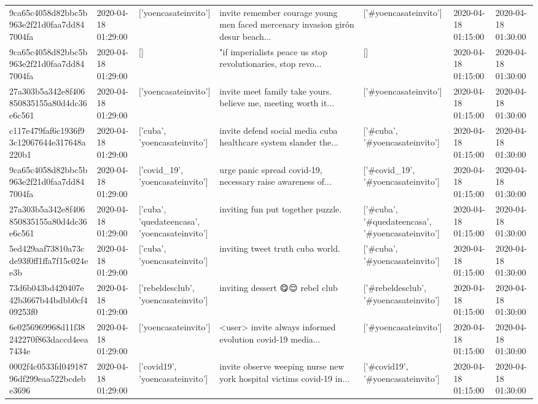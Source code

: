 \begin{tabular}{lllllll}
9ca65c4058d82bbc5b963e2f21d0faa7dd847004fa & 2020-04-18 01:29:00 & ['yoencasateinvito'] & invite remember courage young men faced mercenary invasion girón desur beach... & ['#yoencasateinvito'] & 2020-04-18 01:15:00 & 2020-04-18 01:30:00 \\
9ca65c4058d82bbc5b963e2f21d0faa7dd847004fa & 2020-04-18 01:29:00 & [] & "if imperialists peace us stop revolutionaries, stop revo... & [] & 2020-04-18 01:15:00 & 2020-04-18 01:30:00 \\
27a303b5a342e8f406850835155a80d4dc36e6c561 & 2020-04-18 01:29:00 & ['yoencasateinvito'] & invite meet family take yours. believe me, meeting worth it... & ['#yoencasateinvito'] & 2020-04-18 01:15:00 & 2020-04-18 01:30:00 \\
c117e479faf6c1936f93c12067644e317648a220b1 & 2020-04-18 01:29:00 & ['cuba', 'yoencasateinvito'] & invite defend social media cuba healthcare system slander the... & ['#cuba', '#yoencasateinvito'] & 2020-04-18 01:15:00 & 2020-04-18 01:30:00 \\
9ca65c4058d82bbc5b963e2f21d0faa7dd847004fa & 2020-04-18 01:29:00 & ['covid_19', 'yoencasateinvito'] & urge panic spread covid-19, necessary raise awareness of... & ['#covid_19', '#yoencasateinvito'] & 2020-04-18 01:15:00 & 2020-04-18 01:30:00 \\
27a303b5a342e8f406850835155a80d4dc36e6c561 & 2020-04-18 01:29:00 & ['cuba', 'quedateencasa', 'yoencasateinvito'] & inviting fun put together puzzle. & ['#cuba', '#quedateencasa', '#yoencasateinvito'] & 2020-04-18 01:15:00 & 2020-04-18 01:30:00 \\
5ed429aaf73810a73cde93f0ff1ffa7f15c024ee3b & 2020-04-18 01:29:00 & ['cuba', 'yoencasateinvito'] & inviting tweet truth cuba world. & ['#cuba', '#yoencasateinvito'] & 2020-04-18 01:15:00 & 2020-04-18 01:30:00 \\
73d6b043bd420407e42b3667b44bdbb0cf409253f0 & 2020-04-18 01:29:00 & ['rebeldesclub', 'yoencasateinvito'] & inviting dessert 😋😌 rebel club & ['#rebeldesclub', '#yoencasateinvito'] & 2020-04-18 01:15:00 & 2020-04-18 01:30:00 \\
6e0256969968d11f38242270f863daccd4eea7434e & 2020-04-18 01:29:00 & ['yoencasateinvito'] & <user> invite always informed evolution covid-19 media... & ['#yoencasateinvito'] & 2020-04-18 01:15:00 & 2020-04-18 01:30:00 \\
0002f4c0533fd04918796df299eaa522bcdebe3696 & 2020-04-18 01:29:00 & ['covid19', 'yoencasateinvito'] & invite observe weeping nurse new york hospital victims covid-19 in... & ['#covid19', '#yoencasateinvito'] & 2020-04-18 01:15:00 & 2020-04-18 01:30:00 \\

\end{tabular}
